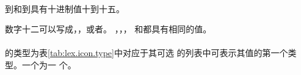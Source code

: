 \paragraph{} %
 到和到具有十进制值十到十五。

\begin{example}
  \begin{sloppypar}
  数字十二可以写成，，或者。
   ，，，
  和都具有相同的值。
  \end{sloppypar}
\end{example}

\paragraph{} %
的类型为表\ref{tab:lex.icon.type}中对应于其可选
的列表中可表示其值的第一个类型。一个为一
个\prvalue{}。

